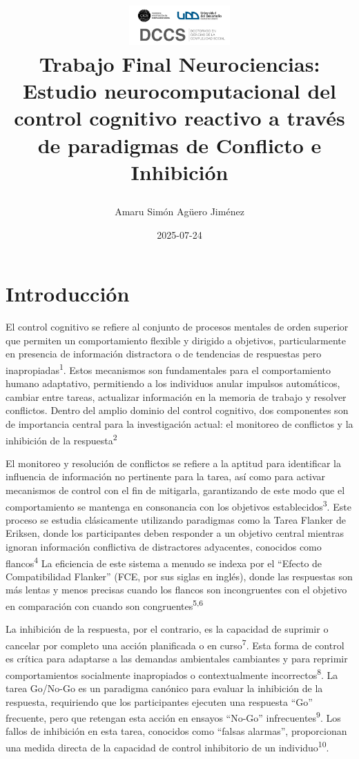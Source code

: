 \documentclass[
  spanish,
  10pt,
]{article}
\title{\begin{center}
  \includegraphics[height=1.5cm]{logo2.png} \\[1cm]
  \Large Trabajo Final Neurociencias: \\ Estudio neurocomputacional del control cognitivo reactivo a través de paradigmas de Conflicto e Inhibición
\end{center}}
\author{Amaru Simón Agüero Jiménez}
\date{2025-07-24}
\renewcommand*\contentsname{Tabla de contenidos}
\newcommand\contentsname{Tabla de contenidos}
\begin{document}
\maketitle

\renewcommand*\contentsname{Tabla de contenidos}
{
\hypersetup{linkcolor=}
\setcounter{tocdepth}{3}
\tableofcontents
}

\newpage

\section{Introducción}\label{introducciuxf3n}

El control cognitivo se refiere al conjunto de procesos mentales de
orden superior que permiten un comportamiento flexible y dirigido a
objetivos, particularmente en presencia de información distractora o de
tendencias de respuestas pero inapropiadas\textsuperscript{1}. Estos
mecanismos son fundamentales para el comportamiento humano adaptativo,
permitiendo a los individuos anular impulsos automáticos, cambiar entre
tareas, actualizar información en la memoria de trabajo y resolver
conflictos. Dentro del amplio dominio del control cognitivo, dos
componentes son de importancia central para la investigación actual: el
monitoreo de conflictos y la inhibición de la
respuesta\textsuperscript{2}

El monitoreo y resolución de conflictos se refiere a la aptitud para
identificar la influencia de información no pertinente para la tarea,
así como para activar mecanismos de control con el fin de mitigarla,
garantizando de este modo que el comportamiento se mantenga en
consonancia con los objetivos establecidos\textsuperscript{3}. Este
proceso se estudia clásicamente utilizando paradigmas como la Tarea
Flanker de Eriksen, donde los participantes deben responder a un
objetivo central mientras ignoran información conflictiva de
distractores adyacentes, conocidos como flancos\textsuperscript{4} La
eficiencia de este sistema a menudo se indexa por el ``Efecto de
Compatibilidad Flanker'' (FCE, por sus siglas en inglés), donde las
respuestas son más lentas y menos precisas cuando los flancos son
incongruentes con el objetivo en comparación con cuando son
congruentes\textsuperscript{5,6}

La inhibición de la respuesta, por el contrario, es la capacidad de
suprimir o cancelar por completo una acción planificada o en
curso\textsuperscript{7}. Esta forma de control es crítica para
adaptarse a las demandas ambientales cambiantes y para reprimir
comportamientos socialmente inapropiados o contextualmente
incorrectos\textsuperscript{8}. La tarea Go/No-Go es un paradigma
canónico para evaluar la inhibición de la respuesta, requiriendo que los
participantes ejecuten una respuesta ``Go'' frecuente, pero que retengan
esta acción en ensayos ``No-Go'' infrecuentes\textsuperscript{9}. Los
fallos de inhibición en esta tarea, conocidos como ``falsas alarmas'',
proporcionan una medida directa de la capacidad de control inhibitorio
de un individuo\textsuperscript{10}.
\end{document}
